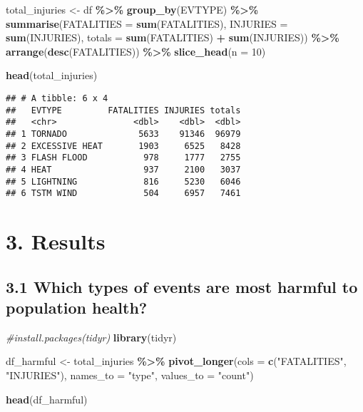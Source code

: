 \documentclass[
]{article}
\newenvironment{Shaded}{\begin{snugshade}}{\end{snugshade}}
\newcommand{\AttributeTok}[1]{\textcolor[rgb]{0.13,0.29,0.53}{#1}}
\newcommand{\CommentTok}[1]{\textcolor[rgb]{0.56,0.35,0.01}{\textit{#1}}}
\newcommand{\DecValTok}[1]{\textcolor[rgb]{0.00,0.00,0.81}{#1}}
\newcommand{\FunctionTok}[1]{\textcolor[rgb]{0.13,0.29,0.53}{\textbf{#1}}}
\newcommand{\NormalTok}[1]{#1}
\newcommand{\OtherTok}[1]{\textcolor[rgb]{0.56,0.35,0.01}{#1}}
\newcommand{\SpecialCharTok}[1]{\textcolor[rgb]{0.81,0.36,0.00}{\textbf{#1}}}
\newcommand{\StringTok}[1]{\textcolor[rgb]{0.31,0.60,0.02}{#1}}
\begin{document}
\begin{Shaded}
\begin{Highlighting}[]
\NormalTok{total\_injuries }\OtherTok{\textless{}{-}}\NormalTok{ df }\SpecialCharTok{\%\textgreater{}\%}
    \FunctionTok{group\_by}\NormalTok{(EVTYPE) }\SpecialCharTok{\%\textgreater{}\%}
    \FunctionTok{summarise}\NormalTok{(}\AttributeTok{FATALITIES =} \FunctionTok{sum}\NormalTok{(FATALITIES),}
              \AttributeTok{INJURIES =} \FunctionTok{sum}\NormalTok{(INJURIES),}
              \AttributeTok{totals =} \FunctionTok{sum}\NormalTok{(FATALITIES) }\SpecialCharTok{+} \FunctionTok{sum}\NormalTok{(INJURIES)) }\SpecialCharTok{\%\textgreater{}\%}
    \FunctionTok{arrange}\NormalTok{(}\FunctionTok{desc}\NormalTok{(FATALITIES)) }\SpecialCharTok{\%\textgreater{}\%}
    \FunctionTok{slice\_head}\NormalTok{(}\AttributeTok{n =} \DecValTok{10}\NormalTok{)}

\FunctionTok{head}\NormalTok{(total\_injuries)}
\end{Highlighting}
\end{Shaded}

\begin{verbatim}
## # A tibble: 6 x 4
##   EVTYPE         FATALITIES INJURIES totals
##   <chr>               <dbl>    <dbl>  <dbl>
## 1 TORNADO              5633    91346  96979
## 2 EXCESSIVE HEAT       1903     6525   8428
## 3 FLASH FLOOD           978     1777   2755
## 4 HEAT                  937     2100   3037
## 5 LIGHTNING             816     5230   6046
## 6 TSTM WIND             504     6957   7461
\end{verbatim}

\hypertarget{results}{%
\section{3. Results}\label{results}}

\hypertarget{which-types-of-events-are-most-harmful-to-population-health}{%
\subsection{3.1 Which types of events are most harmful to population
health?}\label{which-types-of-events-are-most-harmful-to-population-health}}

\begin{Shaded}
\begin{Highlighting}[]
\CommentTok{\#install.packages(\textquotesingle{}tidyr\textquotesingle{})}
\FunctionTok{library}\NormalTok{(tidyr)}

\NormalTok{df\_harmful }\OtherTok{\textless{}{-}}\NormalTok{ total\_injuries }\SpecialCharTok{\%\textgreater{}\%}
    \FunctionTok{pivot\_longer}\NormalTok{(}\AttributeTok{cols =} \FunctionTok{c}\NormalTok{(}\StringTok{"FATALITIES"}\NormalTok{, }\StringTok{"INJURIES"}\NormalTok{),}
                 \AttributeTok{names\_to =} \StringTok{"type"}\NormalTok{,}
                 \AttributeTok{values\_to =} \StringTok{"count"}\NormalTok{)}

\FunctionTok{head}\NormalTok{(df\_harmful)}
\end{Highlighting}
\end{Shaded}
\end{document}
